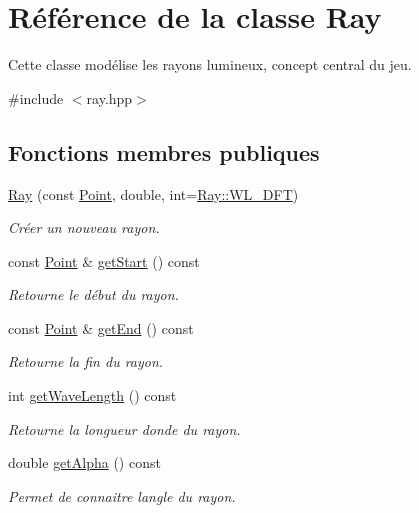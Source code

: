 \hypertarget{classRay}{}\section{Référence de la classe Ray}
\label{classRay}


Cette classe modélise les rayons lumineux, concept central du jeu.  




{\ttfamily \#include $<$ray.\+hpp$>$}

\subsection*{Fonctions membres publiques}
\begin{DoxyCompactItemize}
\item 
\hyperlink{classRay_af80c80c8ccb7721d3c8a0745ada767fa}{Ray} (const \hyperlink{classPoint}{Point}, double, int=\hyperlink{classRay_af4176c69ef62ea83bf84b40d7e1c5560}{Ray\+::\+W\+L\+\_\+\+D\+F\+T})
\begin{DoxyCompactList}\small\item\em Créer un nouveau rayon. \end{DoxyCompactList}\item 
const \hyperlink{classPoint}{Point} \& \hyperlink{classRay_a910d5b44324b73c5fa032c24093d4024}{get\+Start} () const 
\begin{DoxyCompactList}\small\item\em Retourne le début du rayon. \end{DoxyCompactList}\item 
const \hyperlink{classPoint}{Point} \& \hyperlink{classRay_a464697d88415597f098d4f34b0fe16b4}{get\+End} () const 
\begin{DoxyCompactList}\small\item\em Retourne la fin du rayon. \end{DoxyCompactList}\item 
int \hyperlink{classRay_a19c018dc962281e70a1a00bf336ad1a4}{get\+Wave\+Length} () const 
\begin{DoxyCompactList}\small\item\em Retourne la longueur d\textquotesingle{}onde du rayon. \end{DoxyCompactList}\item 
double \hyperlink{classRay_adc4be184293831177b663260619edd37}{get\+Alpha} () const 
\begin{DoxyCompactList}\small\item\em Permet de connaitre l\textquotesingle{}angle du rayon. \end{DoxyCompactList}\item 

\end{DoxyCompactItemize}

